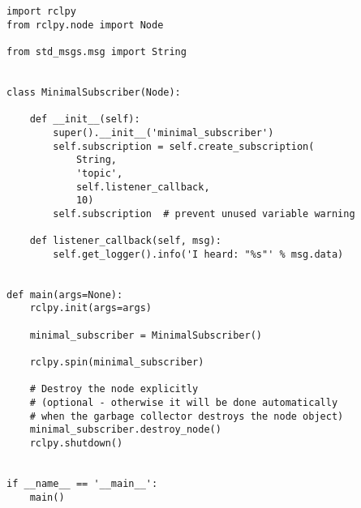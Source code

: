 \begin{verbatim}
import rclpy
from rclpy.node import Node

from std_msgs.msg import String


class MinimalSubscriber(Node):

    def __init__(self):
        super().__init__('minimal_subscriber')
        self.subscription = self.create_subscription(
            String,
            'topic',
            self.listener_callback,
            10)
        self.subscription  # prevent unused variable warning

    def listener_callback(self, msg):
        self.get_logger().info('I heard: "%s"' % msg.data)


def main(args=None):
    rclpy.init(args=args)

    minimal_subscriber = MinimalSubscriber()

    rclpy.spin(minimal_subscriber)

    # Destroy the node explicitly
    # (optional - otherwise it will be done automatically
    # when the garbage collector destroys the node object)
    minimal_subscriber.destroy_node()
    rclpy.shutdown()


if __name__ == '__main__':
    main()
\end{verbatim}
